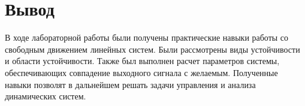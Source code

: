 \chapter{Вывод}
В ходе лабораторной работы были получены практические навыки 
работы со свободным движением линейных систем. Были рассмотрены
виды устойчивости и области устойчивости. Также был выполнен расчет
параметров системы, обеспечивающих совпадение выходного сигнала с
желаемым. Полученные навыки позволят в дальнейшем решать задачи 
управления и анализа динамических систем.
\endinput